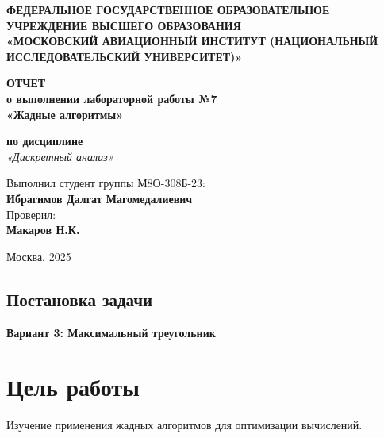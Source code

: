 \documentclass[12pt,a4paper]{article}
\begin{document}
\begin{titlepage}
    \begin{center}
        \vspace*{1cm}
        
        \textbf{ФЕДЕРАЛЬНОЕ ГОСУДАРСТВЕННОЕ ОБРАЗОВАТЕЛЬНОЕ УЧРЕЖДЕНИЕ ВЫСШЕГО ОБРАЗОВАНИЯ} \\
        \textbf{«МОСКОВСКИЙ АВИАЦИОННЫЙ ИНСТИТУТ (НАЦИОНАЛЬНЫЙ ИССЛЕДОВАТЕЛЬСКИЙ УНИВЕРСИТЕТ)»}
        
        \vspace{3cm}
        
        \textbf{\LARGE ОТЧЕТ} \\
        \vspace{0.5cm}
        \textbf{\Large о выполнении лабораторной работы №7} \\
        \vspace{0.5cm}
        \textbf{\Large «Жадные алгоритмы»} \\
        \vspace{1cm}
        
        \textbf{по дисциплине} \\
        \textit{«Дискретный анализ»}
        
        \vfill
        
        \begin{flushleft}
        Выполнил студент группы М8О-308Б-23: \\
        \textbf{Ибрагимов Далгат Магомедалиевич} \\
        \vspace{0.5cm}
        Проверил: \\
        \textbf{Макаров Н.К.}
        \end{flushleft}
        
        \vspace{3cm}
        
        Москва, 2025
    \end{center}
\end{titlepage}


\subsection*{Постановка задачи}

\textbf{Вариант 3: Максимальный треугольник} 

\section*{Цель работы}
Изучение применения жадных алгоритмов для оптимизации вычислений.
\end{document}
